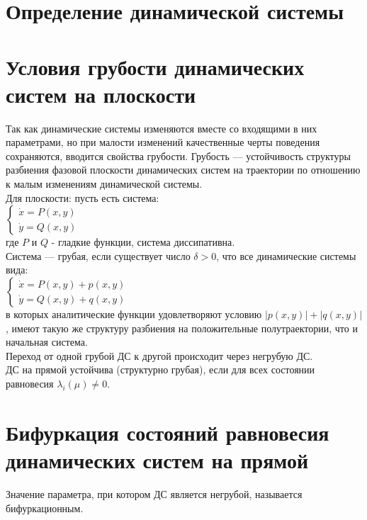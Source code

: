 \newcommand{\colontitulAutors}{astronom\_v\_cube}
\newcommand{\colontitulYear}{2022}
\newcommand{\colontitulEducationalSubject}{Теория колебаний}
\newcommand{\colontitulTeacher}{Некоркин В.И.}




	\small
	\begin{multicols*}{2}
		\section{Определение динамической системы}
		
		\section{Условия грубости динамических систем на плоскости}
		Так как динамические системы изменяются вместе со входящими в них параметрами, но при малости изменений качественные черты поведения сохраняются, вводится свойства грубости. Грубость — устойчивость структуры разбиения фазовой плоскости динамических систем на траектории по отношению к малым изменениям динамической системы.\\
		Для плоскости: пусть есть система:\\
		$\begin{cases}
			\dot{x} = P(x,y) \\
			\dot{y} = Q(x,y)
		\end{cases} $\\
		где $P$ и $Q$ - гладкие функции, система диссипативна.\\
		Система — грубая, если существует число $\delta>0$, что все динамические системы вида:\\
		$\begin{cases}
			\dot{x} = P(x,y) + p(x,y) \\
			\dot{y} = Q(x,y) + q(x,y)
		\end{cases} $\\
		в которых аналитические функции удовлетворяют условию $\left\lvert p(x,y)\right\rvert  + \left\lvert q(x,y)\right\rvert  $, имеют такую же структуру разбиения на положительные полутраектории, что и начальная система.\\
		Переход от одной грубой ДС к другой происходит через негрубую ДС.\\
		ДС на прямой устойчива (структурно грубая), если для всех состоянии равновесия $\lambda_i(\mu)\neq 0$.

		\section{Бифуркация состояний равновесия динамических систем на прямой}
		Значение параметра, при котором ДС является негрубой, называется бифуркационным.


\end{multicols*}

